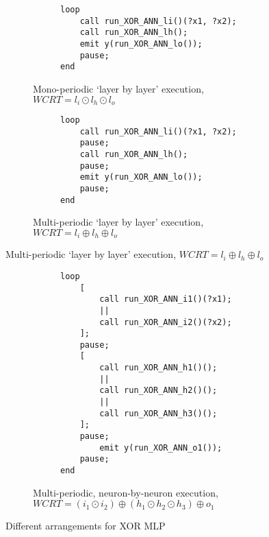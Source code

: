 \begin{figure}[H]
	\centering
\begin{subfigure}[]{0.6\textwidth}
	\centering
	\begin{subfigure}[]{0.3\textwidth}
		\centering
		
	\end{subfigure}%
	\begin{subfigure}[]{0.66\textwidth}
		\vspace{3mm}
		\begin{lstlisting}
loop
	call run_XOR_ANN_li()(?x1, ?x2);
	call run_XOR_ANN_lh();
	emit y(run_XOR_ANN_lo());
	pause;
end
		\end{lstlisting}
	\end{subfigure}
	\caption{Mono-periodic `layer by layer' execution, $WCRT = l_i \odot l_h \odot l_o$}
	\label{fig:tca-bb}
\end{subfigure}

\vspace{5mm}
\begin{subfigure}[]{0.5\textwidth}
	\centering
	\begin{subfigure}[]{0.3\textwidth}
		\centering
		
	\end{subfigure}%
	\begin{subfigure}[]{0.66\textwidth}
	\begin{lstlisting}
loop
	call run_XOR_ANN_li()(?x1, ?x2);
	pause;
	call run_XOR_ANN_lh();
	pause;
	emit y(run_XOR_ANN_lo());
	pause;
end
	\end{lstlisting}
	\end{subfigure}
	\caption{Multi-periodic `layer by layer' execution, $WCRT = l_i \oplus l_h \oplus l_o$}
	\label{fig:tca-layers}
\end{subfigure}
\end{figure}

\begin{figure}[H]
	\centering
\vspace{5mm}
\begin{subfigure}[]{0.8\textwidth}
	\centering
	\begin{subfigure}[]{0.3\textwidth}
		\centering
		
	\end{subfigure}%
	\begin{subfigure}[]{0.66\textwidth}
		\begin{lstlisting}
loop
	[
		call run_XOR_ANN_i1()(?x1);
		|| 
		call run_XOR_ANN_i2()(?x2);
	];
	pause;
	[
		call run_XOR_ANN_h1()();
		||
		call run_XOR_ANN_h2()();
		||
		call run_XOR_ANN_h3()();
	];
	pause;
		emit y(run_XOR_ANN_o1());
	pause;
end
		\end{lstlisting}
	\end{subfigure}
	\caption{Multi-periodic, neuron-by-neuron execution, $WCRT = \left(i_1 \odot i_2\right) \oplus \left(h_1 \odot h_2 \odot h_3\right) \oplus o_1$}
	\label{fig:tca-neurons}
\end{subfigure}
\caption{Different arrangements for XOR \ac{MLP}}
\label{fig:tcas-xor}
\end{figure}